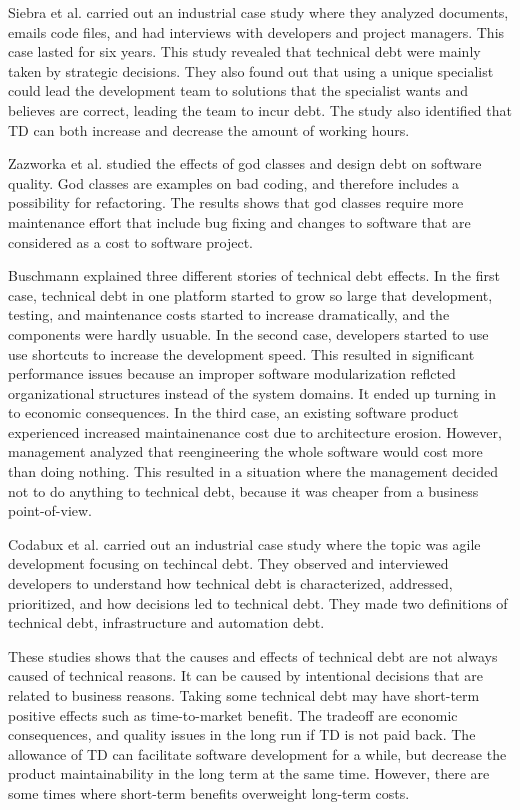 Siebra et al.\cite{p247-siebra} carried out an industrial case study where they analyzed documents, emails code files, and had interviews with developers and project managers. This case lasted for six years. This study revealed that technical debt were mainly taken by strategic decisions. They also found out that using a unique specialist could lead the development team to solutions that the specialist wants and believes are correct, leading the team to incur debt. The study also identified that TD can both increase and decrease the amount of working hours.

Zazworka et al.\cite{zazworka2011investigating} studied the effects of god classes and design debt on software quality. God classes are examples on bad coding, and therefore includes a possibility for refactoring\cite{Zazworka:2011:PDD:1985362.1985372}. The results shows that god classes require more maintenance effort that include bug fixing and changes to software that are considered as a cost to software project.

Buschmann\cite{buschmann2011pay} explained three different stories of technical debt effects. In the first case, technical debt in one platform started to grow so large that development, testing, and maintenance costs started to increase dramatically, and the components were hardly usuable. In the second case, developers started to use use shortcuts to increase the development speed. This resulted in significant performance issues because an improper software modularization reflcted organizational structures instead of the system domains. It ended up turning in to economic consequences. In the third case, an existing software product experienced increased maintainenance cost due to architecture erosion. However, management analyzed that reengineering the whole software would cost more than doing nothing. This resulted in a situation where the management decided not to do anything to technical debt, because it was cheaper from a business point-of-view.

Codabux et al.\cite{p8-codabux} carried out an industrial case study where the topic was agile development focusing on techincal debt. They observed and interviewed developers to understand how technical debt is characterized, addressed, prioritized, and how decisions led to technical debt. They made two definitions of technical debt, infrastructure and automation debt. 

These studies shows that the causes and effects of technical debt are not always caused of technical reasons. It can be caused by intentional decisions that are related to business reasons. Taking some technical debt may have short-term positive effects such as time-to-market benefit. The tradeoff are economic consequences, and quality issues in the long run if TD is not paid back. The allowance of TD can facilitate software development for a while, but decrease the product maintainability in the long term at the same time. However, there are some times where short-term benefits overweight long-term costs. 

